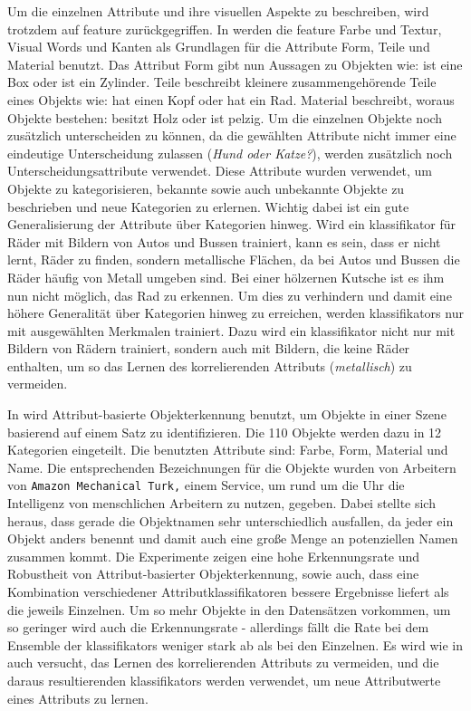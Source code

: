 Um die einzelnen Attribute und ihre visuellen Aspekte zu beschreiben, wird trotzdem auf \gls{feature} zurückgegriffen. In \cite{descObjbyAtr} werden die \gls{feature} Farbe und Textur, Visual Words und Kanten als Grundlagen für die Attribute Form, Teile und Material benutzt. Das Attribut Form gibt nun Aussagen zu Objekten wie: \glqq ist eine Box\grqq \xspace oder \glqq ist ein Zylinder\grqq. Teile beschreibt kleinere zusammengehörende Teile eines Objekts wie: \glqq hat einen Kopf\grqq \xspace oder \glqq hat ein Rad\grqq. Material beschreibt, woraus Objekte bestehen: \glqq besitzt Holz\grqq \xspace oder \glqq ist pelzig\grqq. Um die einzelnen Objekte noch zusätzlich unterscheiden zu können, da die gewählten Attribute nicht immer eine eindeutige Unterscheidung zulassen (\textit{Hund oder Katze?}), werden zusätzlich noch Unterscheidungsattribute verwendet. Diese Attribute wurden verwendet, um Objekte zu kategorisieren, bekannte sowie auch unbekannte Objekte zu beschrieben und neue Kategorien zu erlernen. Wichtig dabei ist ein gute Generalisierung der Attribute über Kategorien hinweg. Wird ein \gls{klassifikator} für Räder mit Bildern von Autos und Bussen trainiert, kann es sein, dass er nicht lernt, Räder zu finden, sondern metallische Flächen, da bei Autos und Bussen die Räder häufig von Metall umgeben sind. Bei einer hölzernen Kutsche ist es ihm nun nicht möglich, das Rad zu erkennen. Um dies zu verhindern und damit eine höhere Generalität über Kategorien hinweg zu erreichen, werden \glspl{klassifikator} nur mit ausgewählten Merkmalen trainiert. Dazu wird ein \gls{klassifikator} nicht nur mit Bildern von Rädern trainiert, sondern auch mit Bildern, die keine Räder enthalten, um so das Lernen des korrelierenden Attributs (\textit{metallisch}) zu vermeiden.  \par    

In \cite{atrBasedObjIden} wird Attribut-basierte Objekterkennung benutzt, um Objekte in einer Szene basierend auf einem Satz zu identifizieren. Die 110 Objekte werden dazu in 12 Kategorien eingeteilt. Die benutzten Attribute sind: Farbe, Form, Material und Name. Die entsprechenden Bezeichnungen für die Objekte wurden von Arbeitern von \texttt{Amazon Mechanical Turk,} einem Service, um rund um die Uhr die Intelligenz von menschlichen Arbeitern zu nutzen, gegeben. Dabei stellte sich heraus, dass gerade die Objektnamen sehr unterschiedlich ausfallen, da jeder ein Objekt anders benennt und damit auch eine große Menge an potenziellen Namen zusammen kommt. Die Experimente zeigen eine hohe Erkennungsrate und Robustheit von Attribut-basierter Objekterkennung, sowie auch, dass eine Kombination verschiedener Attributklassifikatoren bessere Ergebnisse liefert als die jeweils Einzelnen. Um so mehr Objekte in den Datensätzen vorkommen, um so geringer wird auch die Erkennungsrate - allerdings fällt die Rate bei dem Ensemble der \glspl{klassifikator} weniger stark ab als bei den Einzelnen. Es wird wie in \cite{descObjbyAtr} auch versucht, das Lernen des korrelierenden Attributs zu vermeiden, und die daraus resultierenden \glspl{klassifikator} werden verwendet, um neue Attributwerte eines Attributs zu lernen.

